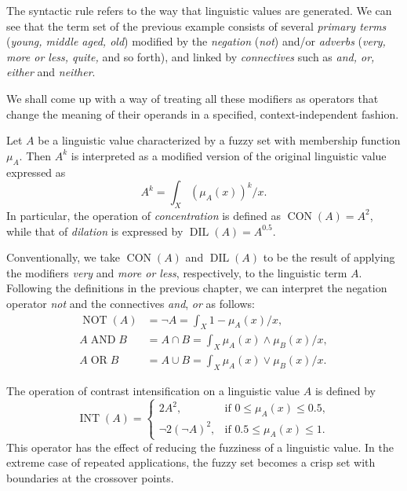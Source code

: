 The syntactic rule refers to the way that linguistic values are generated. We can see that the term set of the previous example consists of several \textit{primary terms} (\textit{young, middle aged, old}) modified by the \textit{negation} (\textit{not}) and/or \textit{adverbs} (\textit{very, more or less, quite,} and so forth), and linked by \textit{connectives} such as \textit{and, or, either} and \textit{neither}.

We shall come up with a way of treating all these modifiers as operators that change the meaning of their operands in a specified, context-independent fashion.

\begin{definition} Let $A$ be a linguistic value characterized by a fuzzy set with membership function $\mu_A$. Then $A^k$ is interpreted as a modified version of the original linguistic value expressed as
\[
A^k = \int_X (\mu_A(x))^k \slash x.
\]
In particular, the operation of \textit{concentration} is defined as $\operatorname{CON}(A)=A^2$, while that of \textit{dilation} is expressed by $\operatorname{DIL}(A)=A^{0.5}$.

\end{definition}

Conventionally, we take $\operatorname{CON}(A)$ and $\operatorname{DIL}(A)$ to be the result of applying the modifiers \textit{very} and \textit{more or less}, respectively, to the linguistic term $A$. Following the definitions in the previous chapter, we can interpret the negation operator \textit{not} and the connectives \textit{and}, \textit{or} as follows:
\begin{align*}
	\operatorname{NOT}(A) &= \neg A = \int_X 1 - \mu_A(x) \slash x,\\
	A \operatorname{AND} B &= A \cap B = \int_X \mu_A(x) \land \mu_B(x) \slash x,\\
	A \operatorname{OR} B &= A \cup B = \int_X \mu_A(x) \lor \mu_B(x) \slash x.
\end{align*}

\begin{definition} The operation of contrast intensification on a linguistic value $A$ is defined by
\[
\operatorname{INT}(A) = \left\{ \begin{array}{ll}
	2A^2, & \text{if }  0 \le \mu_A(x) \le 0.5,\\
	\neg 2(\neg A)^2, & \text{if }  0.5 \le \mu_A(x) \le 1.
\end{array}\right.
\]
This operator has the effect of reducing the fuzziness of a linguistic value. In the extreme case of repeated applications, the fuzzy set becomes a crisp set with boundaries at the crossover points.

\end{definition}

